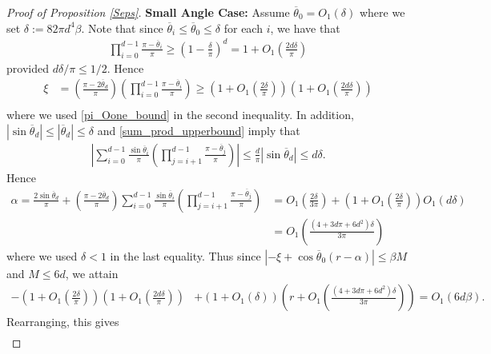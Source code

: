 \documentclass[11pt]{article}
\newcommand{\al}{\alpha}
\theoremstyle{remark}
\begin{document}
\begin{proof}[Proof of Proposition \ref{Seps}]
\textbf{Small Angle Case:} Assume $\overline{\theta}_0 = O_1(\delta)$ where we set $\delta := 82\pi d^4\beta$. Note that since $\overline{\theta}_i \leqslant \overline{\theta}_0 \leqslant \delta$ for each $i$, we have that \begin{align*}
\prod_{i=0}^{d-1} \frac{\pi - \overline{\theta}_i}{\pi} 
\geqslant \left(1 - \frac{\delta}{\pi} \right)^d = 1 + O_1 \left(\frac{2d\delta}{\pi}\right)
\end{align*} provided $d\delta/\pi \leqslant 1/2$. Hence \begin{align*}
\xi  & = \left(\frac{\pi - 2\overline{\theta}_d}{\pi}\right) \left(\prod_{i=0}^{d-1} \frac{\pi - \overline{\theta}_i}{\pi}\right) \geqslant \left(1 + O_1\left(\frac{2\delta}{\pi}\right)\right)\left(1 + O_1\left(\frac{2d\delta}{\pi}\right)\right) \\
\end{align*} where we used \eqref{pi_Oone_bound} in the second inequality. In addition, $|\sin \overline{\theta}_d| \leqslant |\overline{\theta}_d| \leqslant \delta$ and \eqref{sum_prod_upperbound} imply that \begin{align*}
\left|\sum_{i=0}^{d-1} \frac{\sin \overline{\theta}_i}{\pi}\left(\prod_{j=i+1}^{d-1} \frac{\pi - \overline{\theta}_j}{\pi}\right)\right| \leqslant \frac{d}{\pi}|\sin \overline{\theta}_d| \leqslant d\delta. 
\end{align*} Hence \begin{align*}
\al  = \frac{2\sin \overline{\theta}_d}{\pi} + \left(\frac{\pi - 2\overline{\theta}_d}{\pi}\right) \sum_{i=0}^{d-1} \frac{\sin \overline{\theta}_i}{\pi}\left(\prod_{j=i+1}^{d-1} \frac{\pi - \overline{\theta}_j}{\pi}\right)
& = O_1\left(\frac{2\delta}{3\pi}\right) + \left(1 + O_1\left(\frac{2\delta}{\pi}\right)\right)O_1(d\delta) \\
& = O_1 \left(\frac{(4 + 3d\pi + 6d^2)\delta}{3\pi}\right)
\end{align*} where we used $\delta < 1$ in the last equality. Thus since $|-\xi + \cos \overline{\theta}_0(r - \al)| \leqslant \beta M$ and $M \leqslant 6d$, we attain \begin{align*}
- \left(1 + O_1\left(\frac{2\delta}{\pi}\right)\right)\left(1 + O_1\left(\frac{2d\delta}{\pi}\right)\right) & + (1 + O_1(\delta))\left(r + O_1 \left(\frac{(4 + 3d\pi + 6d^2)\delta}{3\pi}\right)\right) = O_1(6d\beta).
\end{align*} Rearranging, this gives \begin{align*}

\end{align*}
\end{proof}
\end{document}
